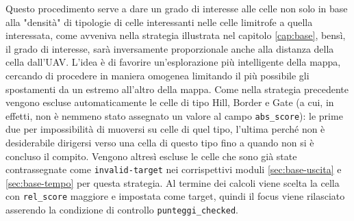 Questo procedimento serve a dare un grado di interesse alle celle non solo in base alla "densità" di tipologie di celle interessanti nelle celle limitrofe a quella interessata, come avveniva nella strategia illustrata nel capitolo \ref{cap:base}, bensì, il grado di interesse, sarà inversamente proporzionale anche alla distanza della cella dall'UAV. L'idea è di favorire un'esplorazione più intelligente della mappa, cercando di procedere in maniera omogenea limitando il più possibile gli spostamenti da un estremo all'altro della mappa.
Come nella strategia precedente vengono escluse automaticamente le celle di tipo Hill, Border e Gate (a cui, in effetti, non è nemmeno stato assegnato un valore al campo \texttt{abs\_score}): le prime due per impossibilità di muoversi su celle di quel tipo, l'ultima perché non è desiderabile dirigersi verso una cella di questo tipo fino a quando non si è concluso il compito.
Vengono altresì escluse le celle che sono già state contrassegnate come \texttt{invalid-target} nei corrispettivi moduli \ref{sec:base-uscita} e \ref{sec:base-tempo} per questa strategia.
Al termine dei calcoli viene scelta la cella con \texttt{rel\_score} maggiore e impostata come target, quindi il focus viene rilasciato asserendo la condizione di controllo \texttt{punteggi\_checked}.

